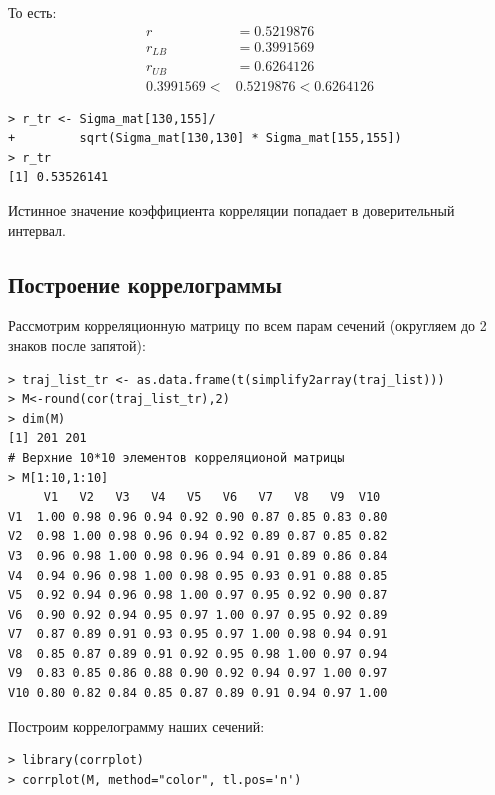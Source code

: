 \documentclass[14pt,a4paper]{scrartcl}
\begin{document}
То есть:
\begin{align*}
	r &= 0.5219876 \\
	r_{LB} &= 0.3991569\\
	r_{UB} &= 0.6264126\\
	0.3991569 < &0.5219876 <0.6264126
\end{align*}


\begin{verbatim}
> r_tr <- Sigma_mat[130,155]/
+         sqrt(Sigma_mat[130,130] * Sigma_mat[155,155])
> r_tr
[1] 0.53526141
\end{verbatim}

Истинное значение коэффициента корреляции попадает в доверительный интервал.


\pagebreak
\subsection*{Построение коррелограммы}

Рассмотрим корреляционную матрицу по всем парам сечений (округляем до 2 знаков после запятой):

\begin{verbatim}
> traj_list_tr <- as.data.frame(t(simplify2array(traj_list)))
> M<-round(cor(traj_list_tr),2)
> dim(M)
[1] 201 201
# Верхние 10*10 элементов корреляционой матрицы
> M[1:10,1:10]
     V1   V2   V3   V4   V5   V6   V7   V8   V9  V10
V1  1.00 0.98 0.96 0.94 0.92 0.90 0.87 0.85 0.83 0.80
V2  0.98 1.00 0.98 0.96 0.94 0.92 0.89 0.87 0.85 0.82
V3  0.96 0.98 1.00 0.98 0.96 0.94 0.91 0.89 0.86 0.84
V4  0.94 0.96 0.98 1.00 0.98 0.95 0.93 0.91 0.88 0.85
V5  0.92 0.94 0.96 0.98 1.00 0.97 0.95 0.92 0.90 0.87
V6  0.90 0.92 0.94 0.95 0.97 1.00 0.97 0.95 0.92 0.89
V7  0.87 0.89 0.91 0.93 0.95 0.97 1.00 0.98 0.94 0.91
V8  0.85 0.87 0.89 0.91 0.92 0.95 0.98 1.00 0.97 0.94
V9  0.83 0.85 0.86 0.88 0.90 0.92 0.94 0.97 1.00 0.97
V10 0.80 0.82 0.84 0.85 0.87 0.89 0.91 0.94 0.97 1.00
\end{verbatim}

Построим коррелограмму наших сечений:

\begin{verbatim}
> library(corrplot)
> corrplot(M, method="color", tl.pos='n')
\end{verbatim}
\end{document}
